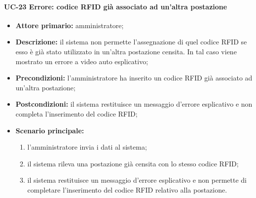 \paragraph{UC-23 Errore: codice RFID già associato ad un'altra postazione}
    \begin{itemize}
	\item \textbf{Attore primario:} amministratore;
	\item \textbf{Descrizione:} il sistema non permette l'assegnazione di quel codice RFID se esso è già stato utilizzato in un'altra postazione censita. In tal caso viene mostrato un errore a video auto esplicativo;
	\item \textbf{Precondizioni:} l'amministratore ha inserito un codice RFID già associato ad un'altra postazione;
	\item \textbf{Postcondizioni:} il sistema restituisce un messaggio d'errore esplicativo e non completa l'inserimento del codice RFID;
	\item \textbf{Scenario principale:}
	      \begin{enumerate}
	      	      \item l'amministratore invia i dati al sistema;
		      \item il sistema rileva una postazione già censita con lo stesso codice RFID;
		      \item il sistema restituisce un messaggio d'errore esplicativo e non permette di completare l'inserimento del codice RFID relativo alla postazione.
	      \end{enumerate}
\end{itemize}


